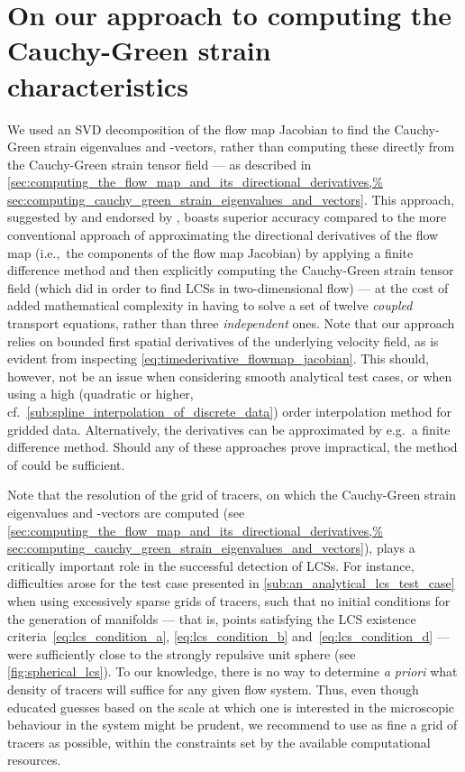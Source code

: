 \section[On our approach to computing the Cauchy-Green
strain characteristics] {On our approach to computing the%
    \\\phantom{5.1} Cauchy-Green strain characteristics}
\label{sec:on_our_approach_to_computing_the_cauchy_green%
_strain_characteristics}

We used an SVD decomposition of the flow map Jacobian to find the Cauchy-Green
strain eigenvalues and -vectors, rather than computing these directly from the
Cauchy-Green strain tensor field --- as described in
\cref{sec:computing_the_flow_map_and_its_directional_derivatives,%
sec:computing_cauchy_green_strain_eigenvalues_and_vectors}. This approach,
suggested by \textcite{miron2012anisotropic} and endorsed by
\textcite{oettinger2016autonomous}, boasts superior accuracy compared to the
more conventional approach of approximating the directional derivatives of the
flow map (i.e.,\ the components of the flow map Jacobian) by applying a finite
difference method and then explicitly computing the Cauchy-Green strain
tensor field (which \textcite{farazmand2012computing} did in order to find LCSs
in two-dimensional flow) --- at the cost of added mathematical complexity in
having to solve a set of twelve \emph{coupled} transport equations, rather than
three \emph{independent} ones. Note that our approach relies on bounded first
spatial derivatives of the underlying velocity field, as is evident from
inspecting \cref{eq:timederivative_flowmap_jacobian}. This should, however, not
be an issue when considering smooth analytical test cases, or when using a high
(quadratic or higher, cf.\ \cref{sub:spline_interpolation_of_discrete_data})
order interpolation method for gridded data. Alternatively, the derivatives can
be approximated by e.g.\ a finite difference method. Should any of these
approaches prove impractical, the method of \textcite{farazmand2012computing}
could be sufficient.

Note that the resolution of the grid of tracers, on which the Cauchy-Green
strain eigenvalues and -vectors are computed (see
\cref{sec:computing_the_flow_map_and_its_directional_derivatives,%
sec:computing_cauchy_green_strain_eigenvalues_and_vectors}), plays a critically
important role in the successful detection of LCSs. For instance, difficulties
arose for the test case presented in \cref{sub:an_analytical_lcs_test_case}
when using excessively sparse grids of tracers, such that no initial
conditions for the generation of manifolds --- that is, points satisfying the
LCS existence criteria~\eqref{eq:lcs_condition_a}, \eqref{eq:lcs_condition_b}
and~\eqref{eq:lcs_condition_d} --- were sufficiently close to the strongly
repulsive unit sphere (see \cref{fig:spherical_lcs}). To our knowledge,
there is no way to determine \emph{a priori} what density of tracers will
suffice for any given flow system. Thus, even though educated guesses based on
the scale at which one is interested in the microscopic behaviour in the system
might be prudent, we recommend to use as fine a grid of tracers as possible,
within the constraints set by the available computational resources.

